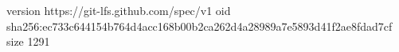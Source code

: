 version https://git-lfs.github.com/spec/v1
oid sha256:ec733c644154b764d4acc168b00b2ca262d4a28989a7e5893d41f2ae8fdad7cf
size 1291

